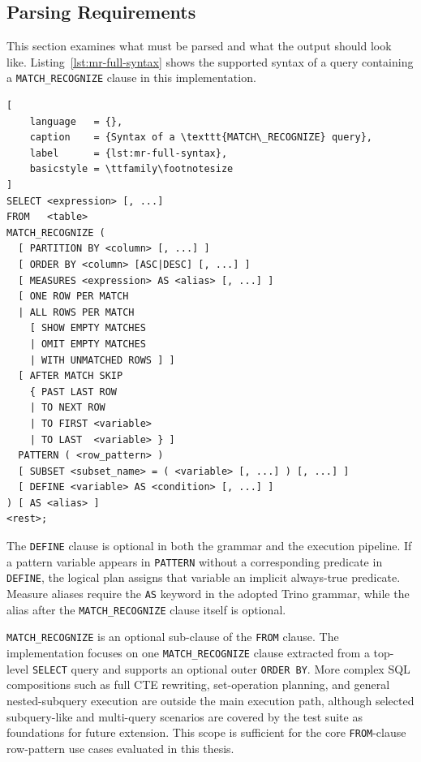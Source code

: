 \subsection{Parsing Requirements}
\label{subsec:meth-parsing-needs}

This section examines what must be parsed and what the output
should look like.  Listing~\ref{lst:mr-full-syntax} shows the
supported syntax of a query containing a \texttt{MATCH\_RECOGNIZE}
clause in this implementation.

\begin{lstlisting}[
    language   = {},
    caption    = {Syntax of a \texttt{MATCH\_RECOGNIZE} query},
    label      = {lst:mr-full-syntax},
    basicstyle = \ttfamily\footnotesize
]
SELECT <expression> [, ...]
FROM   <table>
MATCH_RECOGNIZE (
  [ PARTITION BY <column> [, ...] ]
  [ ORDER BY <column> [ASC|DESC] [, ...] ]
  [ MEASURES <expression> AS <alias> [, ...] ]
  [ ONE ROW PER MATCH
  | ALL ROWS PER MATCH
    [ SHOW EMPTY MATCHES
    | OMIT EMPTY MATCHES
    | WITH UNMATCHED ROWS ] ]
  [ AFTER MATCH SKIP
    { PAST LAST ROW
    | TO NEXT ROW
    | TO FIRST <variable>
    | TO LAST  <variable> } ]
  PATTERN ( <row_pattern> )
  [ SUBSET <subset_name> = ( <variable> [, ...] ) [, ...] ]
  [ DEFINE <variable> AS <condition> [, ...] ]
) [ AS <alias> ]
<rest>;
\end{lstlisting}

The \texttt{DEFINE} clause is optional in both the grammar and the
execution pipeline.  If a pattern variable appears in
\texttt{PATTERN} without a corresponding predicate in
\texttt{DEFINE}, the logical plan assigns that variable an implicit
always-true predicate.
Measure aliases require the \texttt{AS} keyword in the adopted
Trino grammar, while the alias after the
\texttt{MATCH\_RECOGNIZE} clause itself is optional.

\texttt{MATCH\_RECOGNIZE} is an optional sub-clause of the
\texttt{FROM} clause.  The implementation focuses on one
\texttt{MATCH\_RECOGNIZE} clause extracted from a top-level
\texttt{SELECT} query and supports an optional outer
\texttt{ORDER~BY}.  More complex SQL compositions such as full CTE
rewriting, set-operation planning, and general nested-subquery
execution are outside the main execution path, although selected
subquery-like and multi-query scenarios are covered by the test
suite as foundations for future extension.  This scope is sufficient
for the core \texttt{FROM}-clause row-pattern use cases evaluated in
this thesis.

